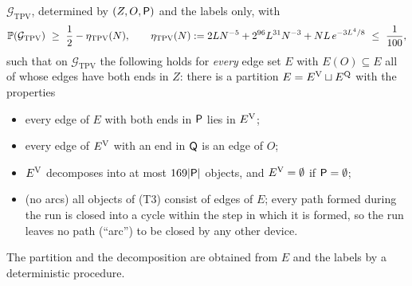 \begin{lemma}
$\mathcal G_{\mathrm{TPV}}$, determined by $(Z,O,\mathsf{P})$ and the labels only, with
\begin{equation}\label{s4:eqTPVprob}
\Prob(\mathcal G_{\mathrm{TPV}})\ \ge\ \frac12-\eta_{\mathrm{TPV}}(N),\qquad
\eta_{\mathrm{TPV}}(N):=2LN^{-5}+2^{96}L^{31}N^{-3}+NL\,e^{-3L^4/8}\ \le\ \frac1{100},
\end{equation}
such that on $\mathcal G_{\mathrm{TPV}}$ the following holds for \emph{every} edge set $E$ with $E(O)\subseteq E$ all
of whose edges have both ends in $Z$: there is a partition $E=E^{\mathrm{V}}\sqcup E^{\mathrm{Q}}$ with the properties
\begin{itemize}
\item[\textup{(T1)}] every edge of $E$ with both ends in $\mathsf{P}$ lies in $E^{\mathrm{V}}$;
\item[\textup{(T2)}] every edge of $E^{\mathrm{V}}$ with an end in $\mathsf{Q}$ is an edge of $O$;
\item[\textup{(T3)}] $E^{\mathrm{V}}$ decomposes into at most $169|\mathsf{P}|$ objects, and
  $E^{\mathrm{V}}=\emptyset$ if $\mathsf{P}=\emptyset$;
\item[\textup{(T4)}] (no arcs) all objects of (T3) consist of edges of $E$; every
  path formed during the run is closed into a cycle within the step in which it is formed, so the run leaves no path
  (``arc'') to be closed by any other device.
\end{itemize}
The partition and the decomposition are obtained from $E$ and the labels by a deterministic procedure.
\end{lemma}

